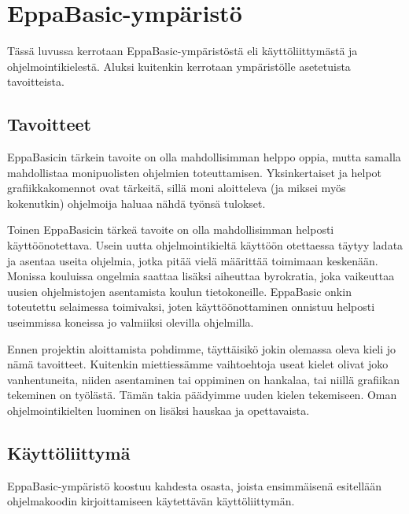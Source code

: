 \section{EppaBasic-ympäristö}
Tässä luvussa kerrotaan EppaBasic-ympäristöstä
eli käyttöliittymästä ja ohjelmointikielestä.
Aluksi kuitenkin kerrotaan ympäristölle
asetetuista tavoitteista.

\subsection{Tavoitteet}
EppaBasicin tärkein tavoite on olla
mahdollisimman helppo oppia,
mutta samalla mahdollistaa
monipuolisten ohjelmien toteuttamisen.
Yksinkertaiset ja helpot grafiikkakomennot ovat tärkeitä,
sillä moni aloitteleva (ja miksei myös kokenutkin)
ohjelmoija haluaa nähdä työnsä tulokset.

Toinen EppaBasicin tärkeä tavoite on olla
mahdollisimman helposti käyttöönotettava.
Usein uutta ohjelmointikieltä käyttöön otettaessa
täytyy ladata ja asentaa useita ohjelmia,
jotka pitää vielä määrittää
toimimaan keskenään.
Monissa kouluissa
ongelmia saattaa lisäksi aiheuttaa byrokratia,
joka vaikeuttaa uusien ohjelmistojen asentamista
koulun tietokoneille.
EppaBasic onkin toteutettu
selaimessa toimivaksi, joten
käyttöönottaminen onnistuu
helposti useimmissa koneissa
jo valmiiksi olevilla ohjelmilla.

Ennen projektin aloittamista pohdimme,
täyttäisikö jokin olemassa oleva
kieli jo nämä tavoitteet.
Kuitenkin miettiessämme vaihtoehtoja
useat kielet olivat joko vanhentuneita,
niiden asentaminen tai oppiminen on hankalaa,
tai niillä grafiikan tekeminen on työlästä.
Tämän takia päädyimme uuden kielen tekemiseen.
Oman ohjelmointikielten luominen on lisäksi hauskaa
ja opettavaista.

\subsection{Käyttöliittymä}
EppaBasic-ympäristö koostuu kahdesta osasta,
joista ensimmäisenä esitellään ohjelmakoodin
kirjoittamiseen käytettävän käyttöliittymän.

